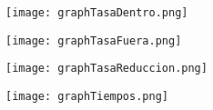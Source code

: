 \documentclass[10pt,a4paper]{article}
\begin{document}
\begin{figure}[H]
\centering
\texttt{[image: graphTasaDentro.png]}
\end{figure}


\begin{figure}[H]
\centering
\texttt{[image: graphTasaFuera.png]}
\end{figure}


\begin{figure}[H]
\centering
\texttt{[image: graphTasaReduccion.png]}
\end{figure}


\begin{figure}[H]
\centering
\texttt{[image: graphTiempos.png]}
\end{figure}
\end{document}
